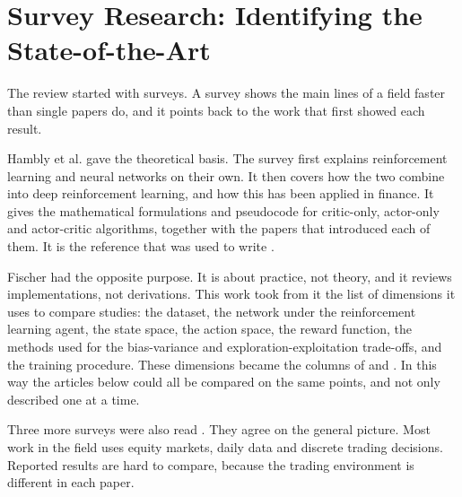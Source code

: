 \section{Survey Research: Identifying the State-of-the-Art}

The review started with surveys. A survey shows the main lines of a field faster than single papers do, and it points back to the work that first showed each result.

Hambly et al. \cite{hambly_recent_2023} gave the theoretical basis. The survey first explains reinforcement learning and neural networks on their own. It then covers how the two combine into deep reinforcement learning, and how this has been applied in finance. It gives the mathematical formulations and pseudocode for critic-only, actor-only and actor-critic algorithms, together with the papers that introduced each of them. It is the reference that was used to write .

Fischer \cite{fischer_reinforcement_2018} had the opposite purpose. It is about practice, not theory, and it reviews implementations, not derivations. This work took from it the list of dimensions it uses to compare studies: the dataset, the network under the reinforcement learning agent, the state space, the action space, the reward function, the methods used for the bias-variance and exploration-exploitation trade-offs, and the training procedure. These dimensions became the columns of  and . In this way the articles below could all be compared on the same points, and not only described one at a time.

Three more surveys were also read \cite{pricope_deep_2021, alameer_reinforcement_2022, meng_reinforcement_2019}. They agree on the general picture. Most work in the field uses equity markets, daily data and discrete trading decisions. Reported results are hard to compare, because the trading environment is different in each paper.